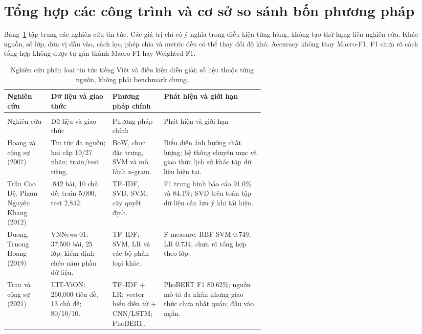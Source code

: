 \FloatBarrier
\section{Tổng hợp các công trình và cơ sở so sánh bốn phương pháp}
Bảng~\ref{tab:related} tập trung các nghiên cứu tin tức. Các giá trị chỉ có ý nghĩa trong điều kiện từng hàng, không tạo thứ hạng liên nghiên cứu. Khác nguồn, số lớp, đơn vị đầu vào, cách lọc, phép chia và metric đều có thể thay đổi độ khó. Accuracy không thay Macro-F1; F1 chưa rõ cách tổng hợp không được tự gán thành Macro-F1 hay Weighted-F1.

\begingroup
\small
\setlength{\tabcolsep}{3pt}
\begin{longtable}{@{}>{\raggedright\arraybackslash}p{0.17\linewidth}>{\raggedright\arraybackslash}p{0.24\linewidth}>{\raggedright\arraybackslash}p{0.20\linewidth}>{\raggedright\arraybackslash}p{}@{}}
\caption{Nghiên cứu phân loại tin tức tiếng Việt và điều kiện diễn giải; số liệu thuộc từng nguồn, không phải benchmark chung.}\label{tab:related}\\
\toprule
Nghiên cứu & Dữ liệu và giao thức & Phương pháp chính & Phát hiện và giới hạn\\\midrule
\endfirsthead
\multicolumn{4}{l}{\tablename\ \thetable\ (tiếp theo)}\\
\toprule Nghiên cứu & Dữ liệu và giao thức & Phương pháp chính & Phát hiện và giới hạn\\\midrule
\endhead
\bottomrule\endfoot
Hoang và cộng sự (2007) \citep{hoang2007} & Tin tức đa nguồn; hai cấp 10/27 nhãn; train/test riêng. & BoW, chọn đặc trưng, SVM và mô hình n-gram. & Biểu diễn ảnh hưởng chất lượng; hệ thống chuyên mục và giao thức lịch sử khác tập dữ liệu hiện tại.\\[4pt]
Trần Cao Đệ, Phạm Nguyên Khang (2012) \citep{de2012} & 7,842 bài, 10 chủ đề; train 5,000, test 2,842. & TF--IDF, SVD, SVM; cây quyết định. & F1 trung bình báo cáo 91.0\% và 84.1\%; SVD trên toàn tập dữ liệu cần lưu ý khi tái hiện.\\[4pt]
Duong, Truong Hoang (2019) \citep{duong2019} & VNNews-01: 37,500 bài, 25 lớp; kiểm định chéo năm phần dữ liệu. & TF--IDF; SVM, LR và các bộ phân loại khác. & F-measure: RBF SVM 0.749, LR 0.734; chưa rõ tổng hợp theo lớp.\\[4pt]
Tran và cộng sự (2021) \citep{tran2021} & UIT-ViON: 260,000 tiêu đề, 13 chủ đề; 80/10/10. & TF--IDF + LR; vector biểu diễn từ + CNN/LSTM; PhoBERT. & PhoBERT F1 80.62\%; nguồn mô tả đa nhãn nhưng giao thức chưa nhất quán; đầu vào ngắn.\\[4pt]

\end{longtable}
